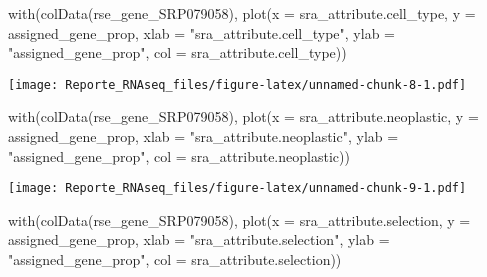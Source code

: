 \documentclass[
]{article}
\newenvironment{Shaded}{\begin{snugshade}}{\end{snugshade}}
\newcommand{\AttributeTok}[1]{\textcolor[rgb]{0.77,0.63,0.00}{#1}}
\newcommand{\FunctionTok}[1]{\textcolor[rgb]{0.00,0.00,0.00}{#1}}
\newcommand{\NormalTok}[1]{#1}
\newcommand{\StringTok}[1]{\textcolor[rgb]{0.31,0.60,0.02}{#1}}
\begin{document}
\begin{Shaded}
\begin{Highlighting}[]
\FunctionTok{with}\NormalTok{(}\FunctionTok{colData}\NormalTok{(rse\_gene\_SRP079058), }\FunctionTok{plot}\NormalTok{(}\AttributeTok{x =}\NormalTok{ sra\_attribute.cell\_type,}
                                       \AttributeTok{y =}\NormalTok{ assigned\_gene\_prop,}
                                       \AttributeTok{xlab =} \StringTok{"sra\_attribute.cell\_type"}\NormalTok{,}
                                       \AttributeTok{ylab =} \StringTok{"assigned\_gene\_prop"}\NormalTok{,}
                                       \AttributeTok{col =}\NormalTok{ sra\_attribute.cell\_type))}
\end{Highlighting}
\end{Shaded}

\texttt{[image: Reporte\_RNAseq\_files/figure-latex/unnamed-chunk-8-1.pdf]}

\begin{Shaded}
\begin{Highlighting}[]
\FunctionTok{with}\NormalTok{(}\FunctionTok{colData}\NormalTok{(rse\_gene\_SRP079058), }\FunctionTok{plot}\NormalTok{(}\AttributeTok{x =}\NormalTok{ sra\_attribute.neoplastic,}
                                       \AttributeTok{y =}\NormalTok{ assigned\_gene\_prop,}
                                       \AttributeTok{xlab =} \StringTok{"sra\_attribute.neoplastic"}\NormalTok{,}
                                       \AttributeTok{ylab =} \StringTok{"assigned\_gene\_prop"}\NormalTok{,}
                                       \AttributeTok{col =}\NormalTok{ sra\_attribute.neoplastic))}
\end{Highlighting}
\end{Shaded}

\texttt{[image: Reporte\_RNAseq\_files/figure-latex/unnamed-chunk-9-1.pdf]}

\begin{Shaded}
\begin{Highlighting}[]
\FunctionTok{with}\NormalTok{(}\FunctionTok{colData}\NormalTok{(rse\_gene\_SRP079058), }\FunctionTok{plot}\NormalTok{(}\AttributeTok{x =}\NormalTok{ sra\_attribute.selection,}
                                       \AttributeTok{y =}\NormalTok{ assigned\_gene\_prop,}
                                       \AttributeTok{xlab =} \StringTok{"sra\_attribute.selection"}\NormalTok{,}
                                       \AttributeTok{ylab =} \StringTok{"assigned\_gene\_prop"}\NormalTok{,}
                                       \AttributeTok{col =}\NormalTok{ sra\_attribute.selection))}
\end{Highlighting}
\end{Shaded}
\end{document}
